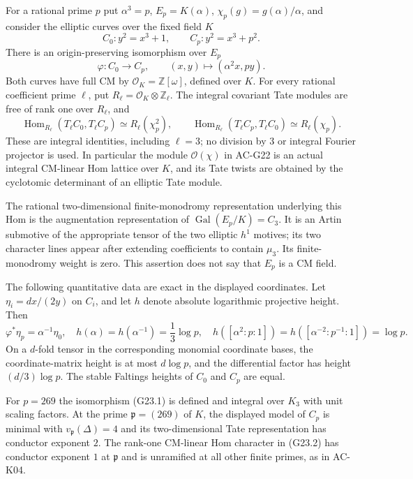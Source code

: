 \begin{proposition}
\label{AC-G23}
For a rational prime $p$ put $\alpha^3=p$,
$E_p=K(\alpha)$, $\chi_p(g)=g(\alpha)/\alpha$, and consider the
elliptic curves over the fixed field $K$
\[
 C_0:y^2=x^3+1,\qquad C_p:y^2=x^3+p^2.
\]
There is an origin-preserving isomorphism over $E_p$
\[
 \varphi:C_0\longrightarrow C_p,
 \qquad (x,y)\longmapsto(\alpha^2x,py).                  \tag{G23.1}
\]
Both curves have full CM by $\mathcal O_K=\mathbb Z[\omega]$,
defined over $K$.  For every rational coefficient prime $\ell$,
put $R_\ell=\mathcal O_K\otimes\mathbb Z_\ell$.  The integral
covariant Tate modules are free of rank one over $R_\ell$, and
\[
 \operatorname{Hom}_{R_\ell}
       (T_\ell C_0,T_\ell C_p)
       \simeq R_\ell(\chi_p^2),\qquad
 \operatorname{Hom}_{R_\ell}
       (T_\ell C_p,T_\ell C_0)
       \simeq R_\ell(\chi_p).                            \tag{G23.2}
\]
These are integral identities, including $\ell=3$; no division by
$3$ or integral Fourier projector is used.  In particular the module
$\mathcal O(\chi)$ in AC-G22 is an actual integral CM-linear Hom
lattice over $K$, and its Tate twists are obtained by the
cyclotomic determinant of an elliptic Tate module.

The rational two-dimensional finite-monodromy representation
underlying this Hom is the augmentation representation of
$\operatorname{Gal}(E_p/K)=C_3$.  It is an Artin submotive of the
appropriate tensor of the two elliptic $h^1$ motives; its two
character lines appear after extending coefficients to contain
$\mu_3$.  Its finite-monodromy weight is zero.  This assertion does
not say that $E_p$ is a CM field.

The following quantitative data are exact in the displayed
coordinates.  Let $\eta_i=dx/(2y)$ on $C_i$, and let $h$ denote
absolute logarithmic projective height.  Then
\[
 \varphi^*\eta_p=\alpha^{-1}\eta_0,
 \quad h(\alpha)=h(\alpha^{-1})=\frac13\log p,
 \quad h([\alpha^2:p:1])=h([\alpha^{-2}:p^{-1}:1])=\log p.
                                                               \tag{G23.3}
\]
On a $d$-fold tensor in the corresponding monomial coordinate bases,
the coordinate-matrix height is at most $d\log p$, and the
differential factor has height $(d/3)\log p$.  The stable Faltings
heights of $C_0$ and $C_p$ are equal.

For $p=269$ the isomorphism (G23.1) is defined and integral over
$K_3$ with unit scaling factors.  At the prime $\mathfrak p=(269)$
of $K$, the displayed model of $C_p$ is minimal with
$v_{\mathfrak p}(\Delta)=4$ and its two-dimensional Tate
representation has conductor exponent $2$.  The rank-one
CM-linear Hom character in (G23.2) has conductor exponent $1$ at
$\mathfrak p$ and is unramified at all other finite primes, as in
AC-K04.
\end{proposition}
